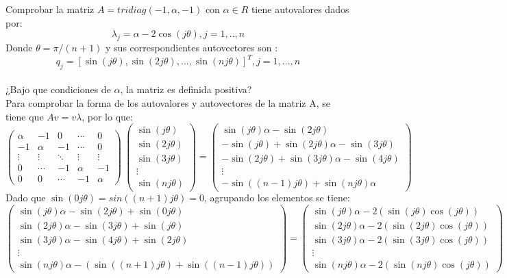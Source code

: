 Comprobar la matriz $A=tridiag(-1,\alpha,-1)$ con $\alpha \in R$ tiene autovalores dados por:\\
$$\lambda_j=\alpha-2\cos(j\theta),j=1,..,n$$
Donde $\theta=\pi/(n+1)$ y sus correspondientes autovectores son :\\
$$q_j = [\sin(j\theta),\sin(2j\theta),...,\sin(nj\theta)]^{T},j=1,...,n$$\\
¿Bajo que condiciones de $\alpha$, la matriz es definida positiva?\\

Para comprobar la forma de los autovalores y autovectores de la matriz A, se tiene que $Av=v\lambda$, por lo que:\\
$$
    \begin{pmatrix}
     \alpha &  -1 & 0 & \cdots & 0 \\
     -1 &  \alpha & -1 & \cdots & 0 \\
     \vdots &  \vdots & \ddots & \vdots & \vdots \\
     0 &  \cdots &  -1 & \alpha &-1 \\
     0 & 0 & \cdots & -1 & \alpha
    \end{pmatrix}\ 
    \begin{pmatrix}
    \sin(j\theta)\\
    \sin(2j\theta)\\
    \sin(3j\theta)\\
    \vdots\\
    \sin(nj\theta)
    \end{pmatrix}=
    \begin{pmatrix}
    \sin(j\theta)\alpha-\sin(2j\theta)\\
    -\sin(j\theta)+\sin(2j\theta)\alpha-\sin(3j\theta)\\
    -\sin(2j\theta)+\sin(3j\theta)\alpha-\sin(4j\theta)\\
    \vdots\\
    -\sin((n-1)j\theta)+\sin(nj\theta)\alpha
    \end{pmatrix}
$$
Dado que $\sin(0j\theta)=sin((n+1)j\theta)=0$, agrupando los elementos se tiene:\\
$$
    \begin{pmatrix}
    \sin(j\theta)\alpha-\sin(2j\theta)+\sin(0j\theta)\\
    \sin(2j\theta)\alpha-\sin(3j\theta)+\sin(j\theta)\\
    \sin(3j\theta)\alpha-\sin(4j\theta)+\sin(2j\theta)\\
    \vdots\\
    \sin(nj\theta)\alpha-(\sin((n+1)j\theta)+\sin((n-1)j\theta))
    \end{pmatrix}=
     \begin{pmatrix}
    \sin(j\theta)\alpha-2(\sin(j\theta)\cos(j\theta))\\
    \sin(2j\theta)\alpha-2(\sin(2j\theta)\cos(j\theta))\\
    \sin(3j\theta)\alpha-2(\sin(3j\theta)\cos(j\theta))\\
    \vdots\\
    \sin(nj\theta)\alpha-2(\sin(nj\theta)\cos(j\theta))
    \end{pmatrix}
$$
